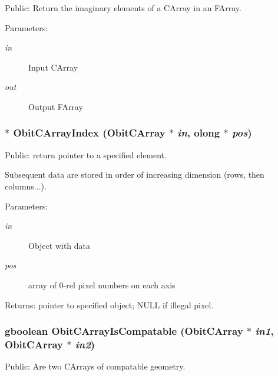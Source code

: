 Public: Return the imaginary elements of a CArray in an FArray. 

\begin{Desc}
\item[Parameters:]
\begin{description}
\item[{\em in}]Input CArray \item[{\em out}]Output FArray \end{description}
\end{Desc}
\subsubsection{$\ast$ Obit\-CArray\-Index ({\bf Obit\-CArray} $\ast$ {\em in}, {\bf olong} $\ast$ {\em pos})}\label{ObitCArray_8h_a42}


Public: return pointer to a specified element. 

Subsequent data are stored in order of increasing dimension (rows, then columns...). \begin{Desc}
\item[Parameters:]
\begin{description}
\item[{\em in}]Object with data \item[{\em pos}]array of 0-rel pixel numbers on each axis \end{description}
\end{Desc}
\begin{Desc}
\item[Returns:]pointer to specified object; NULL if illegal pixel. \end{Desc}
\subsubsection{\setlength{\rightskip}{0pt plus 5cm}gboolean Obit\-CArray\-Is\-Compatable ({\bf Obit\-CArray} $\ast$ {\em in1}, {\bf Obit\-CArray} $\ast$ {\em in2})}\label{ObitCArray_8h_a40}


Public: Are two CArrays of compatable geometry. 

